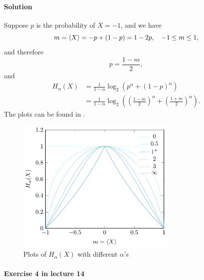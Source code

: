 \documentclass[hyperref, a4paper]{article}
\begin{document}
\paragraph{Solution} Suppose $p$ is the probability of $X = -1$,
and we have 
\begin{equation}
    m = \expval{X} = - p + (1 - p) = 1 - 2p, \quad -1 \leq m \leq 1,
\end{equation}
and therefore 
\begin{equation}
    p = \frac{1 - m}{2}, 
\end{equation}
and 
\begin{equation}
    \begin{aligned}
        H_\alpha(X) &= \frac{1}{1 - \alpha} \log_2(p^{\alpha} + (1 - p)^\alpha) \\
        &= \frac{1}{1 - \alpha} \log_2\left(
            \left( \frac{1 - m}{2} \right)^{\alpha}
            + \left( \frac{1 + m}{2} \right)^{\alpha}
        \right).
    \end{aligned}
\end{equation}
The plots can be found in .

\begin{figure}
    \centering
    \includegraphics[width=0.7\textwidth]{plots/ising-entroy-alpha.pdf}
    \caption{Plots of $H_\alpha(X)$ with different $\alpha$'s}
    \label{fig:entropy-plot}
\end{figure}

\paragraph{Exercise 4 in lecture 14}
\end{document}
